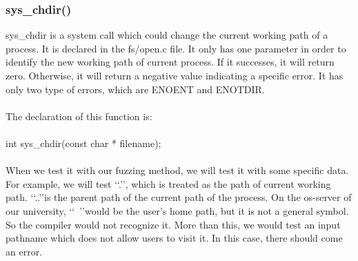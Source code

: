 \documentclass[twoside]{article}
\begin{document}
\begin{multicols}{2}
\subsubsection{sys\_chdir()}
sys\_chdir is a system call which could change the current working path of a process. It is declared in the fs/open.c file. It only has one parameter in order to identify the new working path of current process. If it successes, it will return zero. Otherwise, it will return a negative value indicating a specific error. It has only two type of errors, which are ENOENT and ENOTDIR.\\\\
The declaration of this function is:\\\\
int sys\_chdir(const char * filename);\\\\
When we test it with our fuzzing method, we will test it with some specific data. For example, we will test \lq\lq.\rq\rq, which is treated as the path of current working path. \lq\lq..\rq\rq is the parent path of the current path of the process. On the os-server of our university, \lq\lq~\rq\rq would be the user’s home path, but it is not a general symbol. So the compiler would not recognize it. More than this, we would test an input pathname which does not allow users to visit it. In this case, there should come an error.

\end{multicols}
\end{document}
